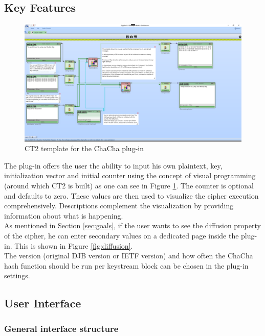 
\subsection{Key Features}
\label{sec:keyFeatures}

\begin{figure}
\centering
\includegraphics[width=\textwidth]{figures/ct2/plugin-template.png}
\caption[ChaCha CT2 template]{CT2 template for the ChaCha plug-in}
\label{fig:plugin.template}
\end{figure}

The plug-in offers the user the ability to input his own plaintext, key, initialization vector and initial counter using the concept of visual programming (around which CT2 is built) as one can see in Figure \ref{fig:plugin.template}. The counter is optional and defaults to zero. These values are then used to visualize the cipher execution comprehensively. Descriptions complement the visualization by providing information about what is happening. \\
As mentioned in Section \ref{sec:goals}, if the user wants to see the diffusion property of the cipher, he can enter secondary values on a dedicated page inside the plug-in. This is shown in Figure \ref{fig:diffusion}. \\
The version (original DJB version or IETF version) and how often the ChaCha hash function should be run per keystream block can be chosen in the plug-in settings.

\subsection{User Interface}
\label{sec:userInterface}

\subsubsection{General interface structure}

